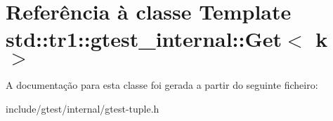 \hypertarget{classstd_1_1tr1_1_1gtest__internal_1_1Get}{\section{Referência à classe Template std\-:\-:tr1\-:\-:gtest\-\_\-internal\-:\-:Get$<$ k $>$}
\label{classstd_1_1tr1_1_1gtest__internal_1_1Get}
}


A documentação para esta classe foi gerada a partir do seguinte ficheiro\-:\begin{DoxyCompactItemize}
\item 
include/gtest/internal/gtest-\/tuple.\-h\end{DoxyCompactItemize}
